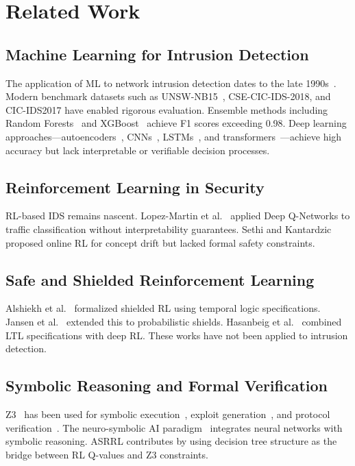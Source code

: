 \documentclass[conference]{IEEEtran}
\newcommand{\ASRRL}{\textsc{ASRRL}}
\begin{document}
\section{Related Work}
\label{sec:related}

\subsection{Machine Learning for Intrusion Detection}

The application of ML to network intrusion detection dates to the late 1990s~\cite{lee1998}. Modern benchmark datasets such as UNSW-NB15~\cite{moustafa2015}, CSE-CIC-IDS-2018, and CIC-IDS2017 have enabled rigorous evaluation. Ensemble methods including Random Forests~\cite{farnaaz2016} and XGBoost~\cite{dhaliwal2018} achieve F1 scores exceeding 0.98. Deep learning approaches---autoencoders~\cite{shone2018}, CNNs~\cite{wang2017}, LSTMs~\cite{kim2018}, and transformers~\cite{hu2022}---achieve high accuracy but lack interpretable or verifiable decision processes.

\subsection{Reinforcement Learning in Security}

RL-based IDS remains nascent. Lopez-Martin et al.~\cite{lopez2020} applied Deep Q-Networks to traffic classification without interpretability guarantees. Sethi and Kantardzic~\cite{sethi2018} proposed online RL for concept drift but lacked formal safety constraints.

\subsection{Safe and Shielded Reinforcement Learning}

Alshiekh et al.~\cite{alshiekh2018} formalized shielded RL using temporal logic specifications. Jansen et al.~\cite{jansen2020} extended this to probabilistic shields. Hasanbeig et al.~\cite{hasanbeig2020} combined LTL specifications with deep RL. These works have not been applied to intrusion detection.

\subsection{Symbolic Reasoning and Formal Verification}

Z3~\cite{demoura2008} has been used for symbolic execution~\cite{shoshitaishvili2016}, exploit generation~\cite{avgerinos2014}, and protocol verification~\cite{bhargavan2017}. The neuro-symbolic AI paradigm~\cite{garcez2019} integrates neural networks with symbolic reasoning. \ASRRL{} contributes by using decision tree structure as the bridge between RL Q-values and Z3 constraints.
\end{document}

